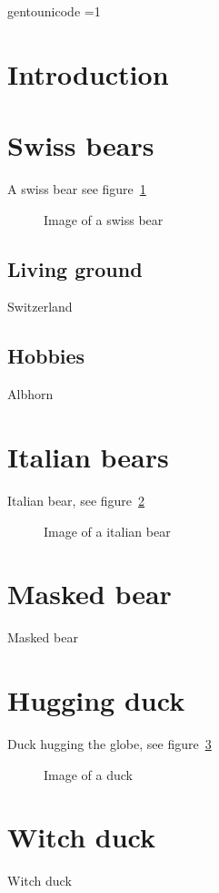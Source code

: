  \ifdefined\directlua
 \pdfvariable gentounicode =1
 \protected\def\pdfglyphtounicode {\pdfextension glyphtounicode } 
 
 \fi
\tableofcontents

\listoffigures

\newpage

\section{Introduction}


\section{Swiss bears}

A swiss bear see figure~\ref{fig:swissbear}

\begin{figure}
\caption{Image of a swiss bear\label{fig:swissbear}}
\end{figure}

\subsection{Living ground}

Switzerland

\subsection{Hobbies}

Albhorn

\section{Italian bears}

Italian bear, see figure~\ref{fig:italianbear}

\begin{figure}
\caption{Image of a italian bear\label{fig:italianbear}}
\end{figure}

\section{Masked bear}

Masked bear

\tagstructend %

\newpage


\section{Hugging duck}

Duck hugging the globe, see figure~\ref{fig:duck}

\begin{figure}
\caption{Image of a duck\label{fig:duck}}
\end{figure}


\section{Witch duck}

Witch duck

\tagstructend 
